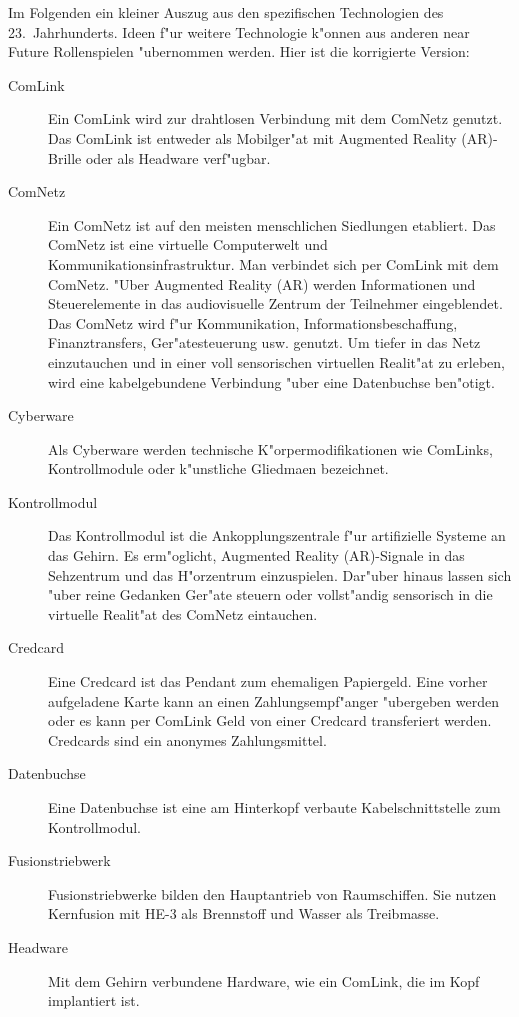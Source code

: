 
Im Folgenden ein kleiner Auszug aus den spezifischen Technologien des 23.~Jahrhunderts. Ideen f"ur weitere Technologie k"onnen aus anderen near Future Rollenspielen "ubernommen werden.
Hier ist die korrigierte Version:

\begin{description}
\item [ComLink] Ein ComLink wird zur drahtlosen Verbindung mit dem ComNetz genutzt. Das ComLink ist entweder als Mobilger"at mit     
      Augmented Reality (AR)-Brille oder als Headware verf"ugbar.
\item [ComNetz] Ein ComNetz ist auf den meisten menschlichen Siedlungen etabliert. Das ComNetz ist eine virtuelle Computerwelt und 
      Kommunikationsinfrastruktur. Man verbindet sich per ComLink mit dem ComNetz. "Uber Augmented Reality (AR) werden Informationen und Steuerelemente in das audiovisuelle Zentrum der Teilnehmer eingeblendet. Das ComNetz wird f"ur Kommunikation, Informationsbeschaffung, Finanztransfers, Ger"atesteuerung usw. genutzt. Um tiefer in das Netz einzutauchen und in einer voll sensorischen virtuellen Realit"at zu erleben, wird eine kabelgebundene Verbindung "uber eine Datenbuchse ben"otigt.
\item [Cyberware] Als Cyberware werden technische K"orpermodifikationen wie ComLinks, Kontrollmodule oder k"unstliche Gliedma\3en 
      bezeichnet.
\item [Kontrollmodul] Das Kontrollmodul ist die Ankopplungszentrale f"ur artifizielle Systeme an das Gehirn. Es erm"oglicht, Augmented 
      Reality (AR)-Signale in das Sehzentrum und das H"orzentrum einzuspielen. Dar"uber hinaus lassen sich "uber reine Gedanken Ger"ate steuern oder vollst"andig sensorisch in die virtuelle Realit"at des ComNetz eintauchen.
\item [Credcard] Eine Credcard ist das Pendant zum ehemaligen Papiergeld. Eine vorher aufgeladene Karte kann an einen 
      Zahlungsempf"anger "ubergeben werden oder es kann per ComLink Geld von einer Credcard transferiert werden. Credcards sind ein anonymes Zahlungsmittel.
\item [Datenbuchse] Eine Datenbuchse ist eine am Hinterkopf verbaute Kabelschnittstelle zum Kontrollmodul.
\item [Fusionstriebwerk] Fusionstriebwerke bilden den Hauptantrieb von Raumschiffen. Sie nutzen Kernfusion mit HE-3 als Brennstoff 
      und Wasser als Treibmasse.
\item [Headware] Mit dem Gehirn verbundene Hardware, wie ein ComLink, die im Kopf implantiert ist.

\end{description}
